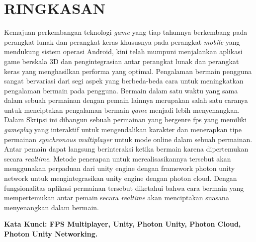 \chapter*{RINGKASAN}
Kemajuan perkembangan teknologi \textit{game} yang tiap 
tahunnya berkembang pada perangkat lunak dan perangkat keras 
khususnya pada perangkat \textit{mobile} yang mendukung sistem 
operasi Android, kini telah mumpuni menjalankan aplikasi game 
berskala 3D dan pengintegrasian antar perangkat lunak dan 
perangkat keras yang menghasilkan performa yang optimal. 
Pengalaman bermain pengguna sangat bervariasi dari 
segi aspek yang berbeda-beda cara untuk meningkatkan 
pengalaman bermain pada pengguna. Bermain dalam satu waktu 
yang sama dalam sebuah permainan dengan pemain lainnya 
merupakan salah satu caranya untuk menciptakan pengalaman 
bermain \textit{game} menjadi lebih menyenangkan. 
Dalam Skripsi ini dibangun sebuah permainan yang 
bergenre fps yang memiliki \textit{gameplay} yang interaktif untuk 
mengendalikan karakter dan menerapkan tipe permainan 
\textit{synchronous} \textit{multiplayer} untuk mode online dalam sebuah 
permainan. Antar pemain dapat langsung berinteraksi ketika 
bermain karena dipertemukan secara \textit{realtime}. Metode 
penerapan untuk merealisasikannya tersebut akan menggunakan 
perpaduan dari unity engine dengan framework photon unity 
network untuk mengintegrasikan unity engine dengan photon 
cloud. Dengan fungsionalitas aplikasi permainan tersebut 
diketahui bahwa cara bermain yang mempertemukan antar 
pemain secara \textit{realtime} akan menciptakan suasana 
menyenangkan dalam bermain.

\noindent \textbf{Kata Kunci: FPS Multiplayer, Unity, Photon Unity, Photon Cloud, Photon Unity Networking.}